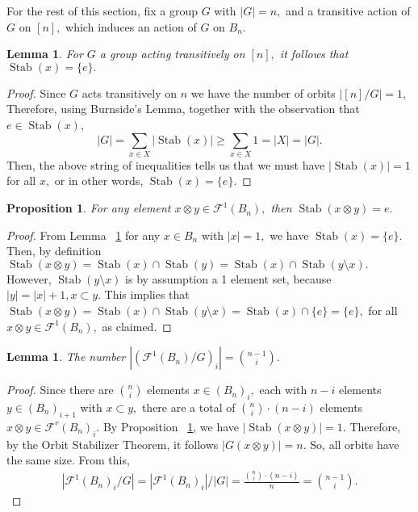 \documentclass{amsart}
\newtheorem{lem}[thm]{Lemma}
\newtheorem{prop}[thm]{Proposition}
\theoremstyle{remark}
\def\Stab{\operatorname{Stab}}
\begin{document}
For the rest of this section, fix a group $G$ with $|G| = n,$ and a transitive action of $G$ on $[n],$ which induces an action of $G$ on $B_n.$

\begin{lem}
\label{lem:stabilizer_one}
For $G$ a group acting transitively on $[n],$ it follows that $\Stab(x) = \{e\}.$
\end{lem}
\begin{proof}
Since $G$ acts transitively on $n$ we have the number of orbits $|[n]/G| = 1,$ Therefore, using Burnside's Lemma, together with the observation that $e \in \Stab(x)$,
$$|G| = \sum_{x\in X}|\Stab(x)|\geq \sum_{x \in X} 1=|X|= |G|.$$
Then, the above string of inequalities tells us that we must have $|\Stab(x)| = 1$ for all $x,$ or in other words, $\Stab(x) = \{e\}.$
\end{proof}

\begin{prop}
\label{prop:stabilizer_edge}
For any element $x \otimes y \in \mathcal F^1(B_n),$ then $\Stab(x\otimes y) = e.$
\end{prop}
\begin{proof}
From Lemma ~\ref{lem:stabilizer_one} for any $x \in B_n$ with $|x| = 1,$ we have $\Stab(x) = \{e\}.$ Then, by definition $\Stab(x\otimes y) = \Stab(x) \cap \Stab(y) = \Stab(x) \cap \Stab(y \setminus x).$ However, $\Stab(y \setminus x)$ is by assumption a 1 element set, because $|y| = |x| +1,x \subset y.$ This implies that $\Stab(x\otimes y)=\Stab(x) \cap \Stab(y \setminus x) = \Stab(x) \cap \{e\} = \{e\},$ for all $x \otimes y \in \mathcal F^1(B_n),$ as claimed.
\end{proof}

\begin{lem}
\label{lem:q_counts}
The number $|(\mathcal F^1(B_n)/G)_i| = \binom{n-1}{i}.$
\end{lem}
\begin{proof}
Since there are $\binom{n}{i}$ elements $x\in(B_n)_i,$ each with $n-i$ elements $y \in (B_n)_{i+1}$ with $x \subset y,$ there are a total of $\binom{n}{i}\cdot (n-i)$ elements $x \otimes y \in \mathcal F^r(B_n)_i.$ By Proposition ~\ref{prop:stabilizer_edge}, we have $|\Stab(x \otimes y)| = 1.$ Therefore, by the Orbit Stabilizer Theorem, it follows $|G(x\otimes y)| = n.$ So, all orbits have the same size. From this,
\begin{align*}
|\mathcal F^1(B_n)_i/G| = |\mathcal F^1(B_n)_i|/|G| = \frac{\binom{n}{i}\cdot (n-i)}{n} = \binom {n-1}{i}.
\end{align*}
\end{proof}
\end{document}
